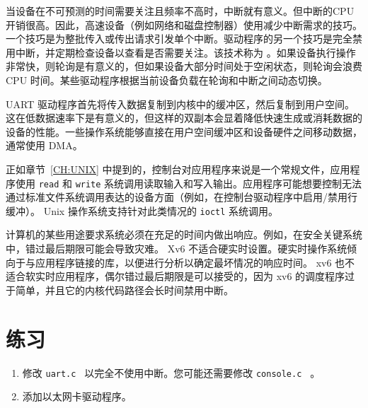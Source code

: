 当设备在不可预测的时间需要关注且频率不高时，中断就有意义。但中断的CPU开销很高。因此，高速设备（例如网络和磁盘控制器）使用减少中断需求的技巧。一个技巧是为整批传入或传出请求引发单个中断。驱动程序的另一个技巧是完全禁用中断，并定期检查设备以查看是否需要关注。该技术称为        。如果设备执行操作非常快，则轮询是有意义的，但如果设备大部分时间处于空闲状态，则轮询会浪费 CPU 时间。某些驱动程序根据当前设备负载在轮询和中断之间动态切换。  

UART 驱动程序首先将传入数据复制到内核中的缓冲区，然后复制到用户空间。这在低数据速率下是有意义的，但这样的双副本会显着降低快速生成或消耗数据的设备的性能。一些操作系统能够直接在用户空间缓冲区和设备硬件之间移动数据，通常使用 DMA。  

正如章节~\ref{CH:UNIX}    中提到的，控制台对应用程序来说是一个常规文件，应用程序使用    \lstinline{read}    和    \lstinline{write}    系统调用读取输入和写入输出。应用程序可能想要控制无法通过标准文件系统调用表达的设备方面（例如，在控制台驱动程序中启用/禁用行缓冲）。 Unix 操作系统支持针对此类情况的    \lstinline{ioctl}    系统调用。  

计算机的某些用途要求系统必须在充足的时间内做出响应。例如，在安全关键系统中，错过最后期限可能会导致灾难。 Xv6 不适合硬实时设置。硬实时操作系统倾向于与应用程序链接的库，以便进行分析以确定最坏情况的响应时间。 xv6 也不适合软实时应用程序，偶尔错过最后期限是可以接受的，因为 xv6 的调度程序过于简单，并且它的内核代码路径会长时间禁用中断。  

   \section{练习  }     

   \begin{enumerate}


   \item   修改  {    \tt    uart.c   }  以完全不使用中断。您可能还需要修改  {    \tt    console.c   } 。   \item   添加以太网卡驱动程序。  \end{enumerate}     


